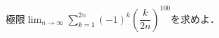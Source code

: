 \documentclass[../../main.tex]{subfiles}
\begin{document}
極限${\displaystyle \lim_{n\to\infty}\sum_{k=1}^{2n}(-1)^k\left(\dfrac{k}{2n}\right)^{100}}$を求めよ．
\end{document}
